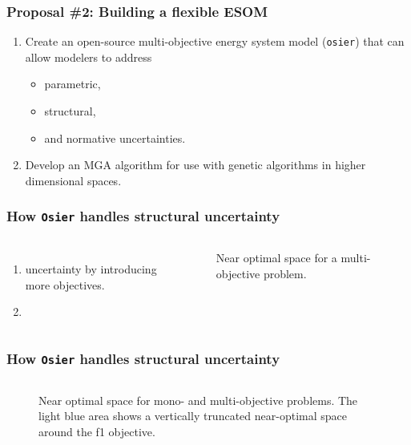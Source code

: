 \begin{frame}
    \frametitle{Proposal \#2: Building a flexible ESOM}

    \begin{enumerate}
        \item Create an open-source multi-objective energy system model (\texttt{osier}) that can allow modelers to address
        \begin{itemize}
            \item parametric,
            \item structural,
            \item and normative uncertainties.
        \end{itemize}
        \item Develop an MGA algorithm for use with genetic algorithms in higher dimensional spaces.
    \end{enumerate}

\end{frame}


\begin{frame}
    \frametitle{How \texttt{Osier} handles structural uncertainty}

    \begin{columns}
        \column[t]{4cm}
        \begin{enumerate}
            \item {} uncertainty by introducing more objectives.
            \item \boldorange{}
        \end{enumerate}
        \column[t]{6cm}
        \begin{figure}
            \centering
            \resizebox{\columnwidth}{!}{}
            \caption{Near optimal space for a multi-objective problem.}
            \label{fig:near-opt}
        \end{figure}
    \end{columns}

\end{frame}

\begin{frame}
    \frametitle{How \texttt{Osier} handles structural uncertainty}

    \begin{columns}
        \column[t]{4cm}

        \column[t]{6cm}
        \begin{figure}
            \centering
            \resizebox{\columnwidth}{!}{}
            \caption{Near optimal space for mono- and multi-objective problems. The light blue area shows
            a vertically truncated near-optimal space around the f1 objective.}
            \label{fig:near-opt-mga}
        \end{figure}
    \end{columns}

\end{frame}

